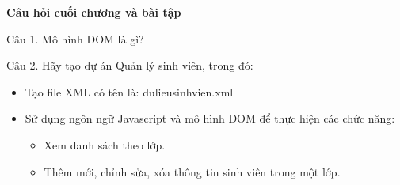 \begin{center}
\textbf{Câu hỏi cuối chương và bài tập}
\end{center}

Câu 1. Mô hình DOM là gì? 

Câu 2. Hãy tạo dự án Quản lý sinh viên, trong đó:
\begin{itemize}


\item Tạo file XML có tên là: dulieusinhvien.xml
\item	Sử dụng ngôn ngữ Javascript và mô hình DOM để thực hiện các chức năng: 
\begin{itemize}
\item	Xem danh sách theo lớp.
\item	Thêm mới, chỉnh sửa, xóa thông tin sinh viên trong một lớp.
\end{itemize}
\end{itemize}



